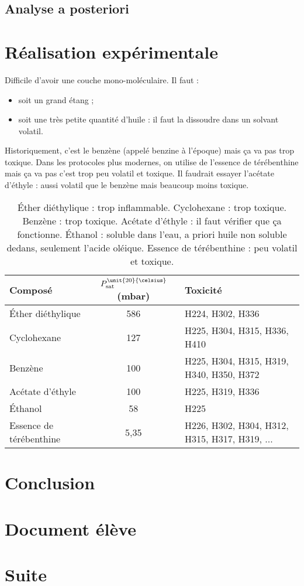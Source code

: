 \documentclass[12pt,a4paper]{article}
\begin{document}
\subsection{Analyse a posteriori}

\section{Réalisation expérimentale}

Difficile d'avoir une couche mono-moléculaire.
Il faut :
\begin{itemize}
\item soit un grand étang ;
\item soit une très petite quantité d'huile : il faut la dissoudre dans un solvant volatil.
\end{itemize}
Historiquement, c'est le benzène (appelé benzine à l'époque) mais ça va pas trop toxique.
Dans les protocoles plus modernes, on utilise de l'essence de térébenthine mais ça va pas c'est trop peu volatil et toxique.
Il faudrait essayer l'acétate d'éthyle : aussi volatil que le benzène mais beaucoup moins toxique.
 

\begin{table}
\center
\begin{tabular}{l|c|l}
\textbf{Composé} & $P_\mathrm{sat}^{\unit{20}{\celsius}}$ (mbar) & \textbf{Toxicité} \\
\hline \hline
Éther diéthylique & 586 & H224, H302, H336 \\
Cyclohexane & 127 & H225, H304, H315, H336, H410 \\
Benzène & 100 & H225, H304, H315, H319, H340, H350, H372 \\
Acétate d'éthyle & 100 & H225, H319, H336 \\
Éthanol & 58 & H225 \\
Essence de térébenthine  & 5{,}35 &  H226, H302, H304, H312, H315, H317, H319, ... \\
\end{tabular}
\caption{Éther diéthylique : trop inflammable. Cyclohexane : trop toxique. Benzène : trop toxique. Acétate d'éthyle : il faut vérifier que ça fonctionne. Éthanol : soluble dans l'eau, a priori huile non soluble dedans, seulement l'acide oléique. Essence de térébenthine : peu volatil et toxique.}
\end{table}

\section*{Conclusion}

\newpage
\appendix



\newpage
\section{Document élève}


\newpage
\section{Suite}
\end{document}
